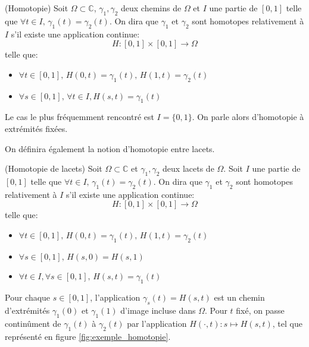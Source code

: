 \begin{fdefn}(Homotopie)
Soit $\Omega \subset \mathbb{C}$, $\gamma_1, \gamma_2$ deux chemins de $\Omega$ et $I$ une partie de $[0,1]$ telle que $\forall t \in I, \, \gamma_1(t) = \gamma_2(t)$. On dira que $\gamma_1$ et $\gamma_2$ sont homotopes relativement à $I$ s'il existe une application continue:
\[
H \colon [0,1] \times [0,1] \to \Omega
\] 
telle que:
\begin{itemize}
\item $\forall t \in [0,1], \, H(0,t) = \gamma_1(t), \, H(1,t) = \gamma_2(t)$
\item $\forall s \in [0,1], \, \forall t \in I, H(s,t) = \gamma_1(t)$
\end{itemize}
\end{fdefn}
\begin{rem}
Le cas le plus fréquemment rencontré est $I=\{0,1\}$. On parle alors d'homotopie à extrémités fixées.
\end{rem}
On définira également la notion d'homotopie entre lacets.
\begin{fdefn}(Homotopie de lacets)
Soit $\Omega \subset \mathbb{C}$ et  $\gamma_1, \gamma_2$ deux
lacets de $\Omega$. Soit $I$ une partie de $[0,1]$ telle que $\forall t \in I, \, \gamma_1(t)=\gamma_2(t)$.
On dira que $\gamma_1$ et $\gamma_2$ sont homotopes relativement à $I$ s'il existe une application continue:
\[
H \colon [0,1] \times [0,1] \to \Omega
\] 
telle que:
\begin{itemize}
\item $\forall t \in [0,1], \, H(0,t) = \gamma_1(t), \, H(1,t) = \gamma_2(t)$
\item $\forall s \in [0,1], \, H(s,0) = H(s,1)$
\item $\forall t \in I, \forall s \in [0,1], \, H(s,t)=\gamma_1(t)$
\end{itemize}
\end{fdefn}
Pour chaque $s\in [0,1]$, l'application $\gamma_s(t)=H(s,t)$ est un chemin d'extrémités $\gamma_1(0)$ et $\gamma_1(1)$ d'image incluse dans $\Omega$. Pour $t$ fixé, on passe continûment de $\gamma_1(t)$ à $\gamma_2(t)$ par l'application $H(\cdot, t) \colon s \mapsto H(s,t)$, tel que représenté en figure \ref{fig:exemple_homotopie}.
